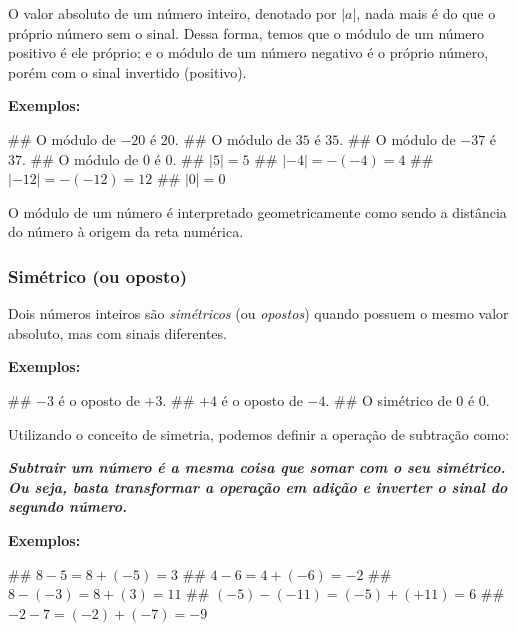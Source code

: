 \documentclass{exam}
\begin{document}
\begin{multicols*}{2}
		O valor absoluto de um número inteiro, denotado por $|a|$, nada mais é do que o próprio número sem o sinal.
		Dessa forma, temos que o módulo de um número positivo é ele próprio; e o módulo de um número negativo é o próprio número, porém com o sinal invertido (positivo).
		
		\textbf{Exemplos:}
		
		\begin{easylist}[enumerate]
			## O módulo de $-20$ é $20$.
			## O módulo de $35$ é $35$.
			## O módulo de $-37$ é $37$.
			## O módulo de $0$ é $0$.
			## $|5| = 5$
			## $|-4| = -(-4) = 4$
			## $|-12| = -(-12) = 12$
			## $|0| = 0$
						
		\end{easylist}
		
		O módulo de um número é interpretado geometricamente como sendo a distância do número à origem da reta numérica.
		

		\subsubsection{Simétrico (ou oposto)}
		
		Dois números inteiros são \textit{simétricos} (ou \textit{opostos})  quando possuem o mesmo valor absoluto, mas com sinais diferentes.
		
		\textbf{Exemplos:}
		
		\begin{easylist}[enumerate]
			## $-3$ é o oposto de $+3$.
			## $+4$ é o oposto de $-4$.
			## O simétrico de $0$ é $0$.
				
		\end{easylist}

Utilizando o conceito de simetria, podemos definir a operação de subtração como:

\textbf{\textit{Subtrair um número é a mesma coisa que somar com o seu simétrico. Ou seja, basta transformar a operação em adição e inverter o sinal do segundo número.}}

		\textbf{Exemplos:}

		\begin{easylist}[enumerate]
		
			## $8 - 5 = 8 + (-5) = 3$
			## $4 - 6 = 4 + (-6) = -2$
			## $8 - (-3) = 8 + (3) = 11$
			## $(-5) - (-11) = (-5) + (+11) = 6$
			## $-2-7 = (-2) + (-7) = -9$
			
			
		\end{easylist}



	\end{multicols*}
\end{document}
